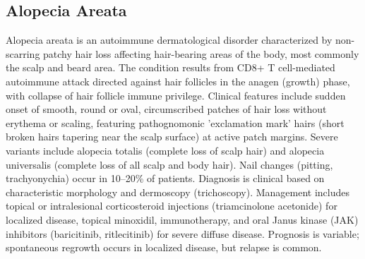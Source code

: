 






\label{sec:Urticaria and Related Disorders}

\subsection{Alopecia Areata}
\label{sec:Alopecia Areata}
Alopecia areata is an autoimmune dermatological disorder characterized by non-scarring patchy hair loss affecting hair-bearing areas of the body, most commonly the scalp and beard area. The condition results from CD8+ T cell-mediated autoimmune attack directed against hair follicles in the anagen (growth) phase, with collapse of hair follicle immune privilege. Clinical features include sudden onset of smooth, round or oval, circumscribed patches of hair loss without erythema or scaling, featuring pathognomonic 'exclamation mark' hairs (short broken hairs tapering near the scalp surface) at active patch margins. Severe variants include alopecia totalis (complete loss of scalp hair) and alopecia universalis (complete loss of all scalp and body hair). Nail changes (pitting, trachyonychia) occur in 10--20\% of patients. Diagnosis is clinical based on characteristic morphology and dermoscopy (trichoscopy). Management includes topical or intralesional corticosteroid injections (triamcinolone acetonide) for localized disease, topical minoxidil, immunotherapy, and oral Janus kinase (JAK) inhibitors (baricitinib, ritlecitinib) for severe diffuse disease. Prognosis is variable; spontaneous regrowth occurs in localized disease, but relapse is common.

